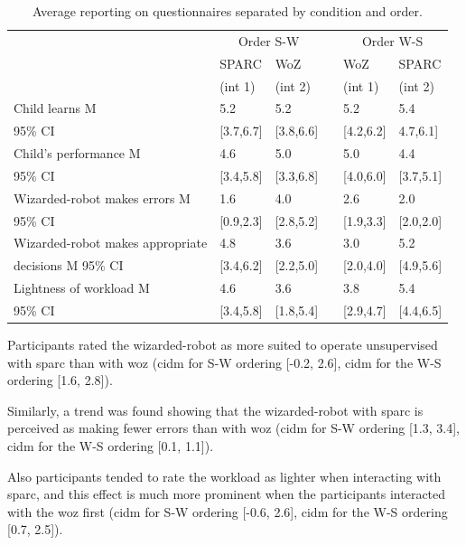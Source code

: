 \begin{table}[t]
	\caption{Average reporting on questionnaires separated by condition and order.}
	\centering
\begin{tabular}{@{}lllcll@{}}\toprule
	& \multicolumn{2}{c}{Order S-W} & \phantom{abc} & \multicolumn{2}{c}{Order W-S} \\
	\cmidrule{2-3} \cmidrule{5-6}
	& SPARC & WoZ && WoZ & SPARC \\
	& (int 1) & (int 2) && (int 1) & (int 2) \\
	\midrule					
		Child learns M & 5.2 & 5.2 && 5.2 & 5.4 \\
		95\% CI & [3.7,6.7] & [3.8,6.6] &&  [4.2,6.2] & 4.7,6.1]\\[.2cm]
		Child's performance M & 4.6 & 5.0 && 5.0 & 4.4 \\
		95\% CI & [3.4,5.8] & [3.3,6.8] && [4.0,6.0] & [3.7,5.1]\\[.2cm]
		Wizarded-robot makes errors M & 1.6 & 4.0 && 2.6 & 2.0 \\
		95\% CI & [0.9,2.3] & [2.8,5.2] && [1.9,3.3] & [2.0,2.0] \\[.2cm]
		Wizarded-robot makes appropriate & 4.8 & 3.6 && 3.0  & 5.2 \\
		decisions M 95\% CI & [3.4,6.2] & [2.2,5.0] && [2.0,4.0] & [4.9,5.6] \\ [.2cm]
		Lightness of workload M & 4.6  & 3.6 && 3.8  & 5.4 \\
		95\% CI & [3.4,5.8] & [1.8,5.4] && [2.9,4.7] & [4.4,6.5] \\
		\bottomrule
	\end{tabular}
	\label{tab:woz_quest_means}
\end{table}


Participants rated the wizarded-robot as more suited to operate unsupervised with \gls{sparc} than with \gls{woz}  (\gls{cidm} for S-W ordering [-0.2, 2.6], \gls{cidm} for the W-S ordering [1.6, 2.8]).

Similarly, a trend was found showing that the wizarded-robot with \gls{sparc} is perceived as making fewer errors than with \gls{woz} (\gls{cidm} for S-W ordering [1.3, 3.4], \gls{cidm} for the W-S ordering [0.1, 1.1]). 

Also participants tended to rate the workload as lighter when interacting with \gls{sparc}, and this effect is much more prominent when the participants interacted with the \gls{woz} first (\gls{cidm} for S-W ordering [-0.6, 2.6], \gls{cidm} for the W-S ordering [0.7, 2.5]).

